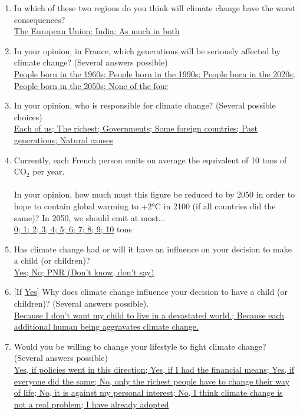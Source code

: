 \documentclass[english,5p,authoryear]{elsarticle}
\begin{document}
\begin{appendices}
\begin{enumerate}[resume,leftmargin=*]
{be able to live with it; Grave, because there would be more natural
disasters; Disastrous, lifestyles would be largely altered; Cataclysmic,
humankind would disappear; PNR(Don't know, don't say) }
\item In which of these two regions do you think will climate change have
the worst consequences? \uline{}\\
\uline{The European Union; India; As much in both }
\item In your opinion, in France, which generations will be seriously affected
by climate change? (Several answers possible) \uline{}\\
\uline{People born in the 1960s; People born in the 1990s; People born
in the 2020s; People born in the 2050s; None of the four }
\item In your opinion, who is responsible for climate change? (Several possible
choices) \uline{}\\
\uline{Each of us; The richest; Governments; Some foreign countries;
Past generations; Natural causes }
\item Currently, each French person emits on average the equivalent of 10
tons of CO$_{2}$ per year. \\
\\
In your opinion, how much must this figure be reduced to by 2050 in
order to hope to contain global warming to +2°C in 2100 (if all countries
did the same)? In 2050, we should emit at most... \uline{}\\
\uline{0; 1; 2; 3; 4; 5; 6; 7; 8; 9; 10} tons 
\item Has climate change had or will it have an influence on your decision
to make a child (or children)?\uline{ }\\
\uline{Yes; No; PNR (Don't know, don't say)}
\item {[}If \uline{Yes}{]} Why does climate change influence your decision
to have a child (or children)? (Several answers possible). \uline{}\\
\uline{Because I don't want my child to live in a devastated world.;
Because each additional human being aggravates climate change.}
\item Would you be willing to change your lifestyle to fight climate change?
(Several answers possible) \uline{}\\
\uline{Yes, if policies went in this direction; Yes, if I had the financial
means; Yes, if everyone did the same; No, only the richest people
have to change their way of life; No, it is against my personal interest;
No, I think climate change is not a real problem; I have already adopted
}
\end{enumerate}
\end{appendices}
\end{document}
